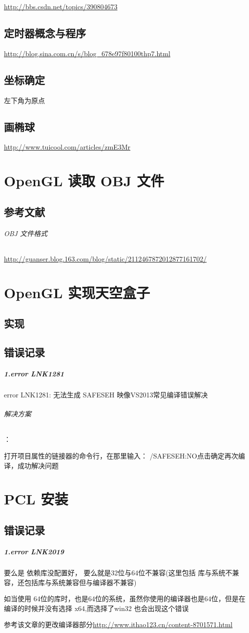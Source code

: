 \documentclass[UTF8,a4paper,8pt]{ctexbook}
\begin{document}
		\url{http://bbs.csdn.net/topics/390804673}
			
	\section{定时器概念与程序}
		\url{http://blog.sina.com.cn/s/blog_678e97f80100thp7.html}
			
			
	\section{坐标确定}
		左下角为原点
		
	\section{画椭球}
		\url{http://www.tuicool.com/articles/zmE3Mr}
		

\chapter{OpenGL 读取 OBJ 文件}
    \section{参考文献} 
		\subparagraph{OBJ 文件格式}\url{http://guanser.blog.163.com/blog/static/2112467872012877161702/}
	
	
 
\chapter{OpenGL 实现天空盒子}
	\section{实现}
		
	\section{错误记录}
		\paragraph{1.error LNK1281}error LNK1281: 无法生成 SAFESEH 映像VS2013常见编译错误解决
		
		\subparagraph{解决方案}：
		
		打开项目属性的链接器的命令行，在那里输入： /SAFESEH:NO点击确定再次编译，成功解决问题


\chapter{PCL  安装}
	\section{错误记录}
		\paragraph{1.error LNK2019} 要么是 依赖库没配置好， 要么就是32位与64位不兼容(这里包括 库与系统不兼容，还包括库与系统兼容但与编译器不兼容)
		
		如当使用 64位的库时，也是64位的系统，虽然你使用的编译器也是64位，但是在编译的时候并没有选择 x64,而选择了win32 也会出现这个错误
		
		参考该文章的更改编译器部分\url{http://www.ithao123.cn/content-8701571.html}
\end{document}
